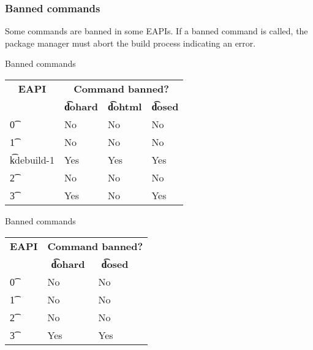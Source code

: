 \subsubsection{Banned commands}
\label{sec:banned-commands}

 Some commands are banned in some EAPIs. If a banned command is
called, the package manager must abort the build process indicating an error.

\IFKDEBUILDELSE
{
    \begin{centertable}{Banned commands} \label{tab:banned-commands-table}
    \begin{tabular}{ l l l l }
        \toprule
        \multicolumn{1}{c}{\textbf{EAPI}} &
        \multicolumn{3}{c}{\textbf{Command banned?}} \\
        \multicolumn{1}{c}{} &
        \multicolumn{1}{c}{\textbf{\t{dohard}}} &
        \multicolumn{1}{c}{\textbf{\t{dohtml}}} &
        \multicolumn{1}{c}{\textbf{\t{dosed}}} \\
        \midrule
    \t{0} & No & No & No \\
    \t{1} & No & No & No \\
    \t{kdebuild-1} & Yes & Yes & Yes \\
    \t{2} & No & No & No \\
    \t{3} & Yes & No & Yes \\
    \bottomrule
    \end{tabular}
    \end{centertable}
}{
    \begin{centertable}{Banned commands} \label{tab:banned-commands-table}
    \begin{tabular}{ l l l l }
        \toprule
        \multicolumn{1}{c}{\textbf{EAPI}} &
        \multicolumn{3}{c}{\textbf{Command banned?}} \\
        \multicolumn{1}{c}{} &
        \multicolumn{1}{c}{\textbf{\t{dohard}}} &
        \multicolumn{1}{c}{\textbf{\t{dosed}}} \\
        \midrule
    \t{0} & No & No \\
    \t{1} & No & No \\
    \t{2} & No & No \\
    \t{3} & Yes & Yes \\
    \bottomrule
    \end{tabular}
    \end{centertable}
}

